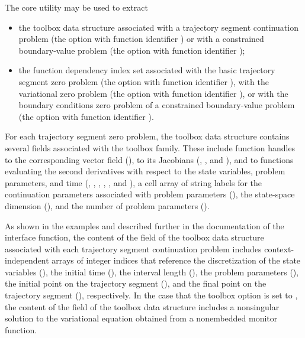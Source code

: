 The  core utility may be used to extract
\begin{itemize}
\item the toolbox data structure associated with a trajectory segment continuation problem (the  option with function identifier ) or with a constrained boundary-value problem (the  option with function identifier );
\item the function dependency index set associated with the basic trajectory segment zero problem (the  option with function identifier ), with the variational zero problem (the  option with function identifier ), or with the boundary conditions zero problem of a constrained boundary-value problem (the  option with function identifier ).
\end{itemize}
For each trajectory segment zero problem, the toolbox data structure contains several fields associated with the  toolbox family. These include function handles to the corresponding vector field (), to its Jacobians (, , and ), and to functions evaluating the second derivatives with respect to the state variables, problem parameters, and time (, , , , , and ), a cell array of string labels for the continuation parameters associated with problem parameters (), the state-space dimension (), and the number of problem parameters ().

As shown in the examples and described further in the documentation of the  interface function, the content of the  field of the toolbox data structure associated with each trajectory segment continuation problem includes context-independent arrays of integer indices that reference the discretization of the state variables (), the initial time (), the interval length (), the problem parameters (), the initial point on the trajectory segment (), and the final point on the trajectory segment (), respectively. In the case that the  toolbox option is set to , the content of the  field of the toolbox data structure includes a nonsingular solution to the variational equation obtained from a nonembedded monitor function. 

